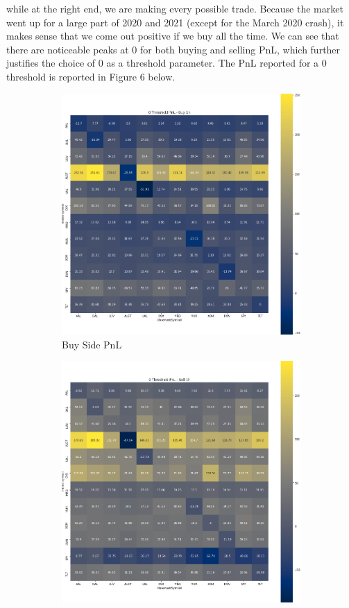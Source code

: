 \documentclass{article}
\begin{document}
while at the right end, we are making every possible trade. Because the market went
up for a large part of 2020 and 2021 (except for the March 2020 crash), it makes sense
that we come out positive if we buy all the time. 
We can see that there are noticeable peaks at 0 for both buying and selling PnL, which
further justifies the choice of 0 as a threshold parameter. The PnL reported for a
0 threshold is reported in Figure 6 below.
\begin{figure}[h!]
  \centering
  \begin{subfigure}{.5\textwidth}
    \centering
    \includegraphics[width=.95\linewidth]{../Figures/pair_buy_pnl_1h.png}
    \caption{Buy Side PnL}
  \end{subfigure}%
  \begin{subfigure}{.5\textwidth}
    \centering
    \includegraphics[width=.95\linewidth]{../Figures/pair_sell_pnl_1h.png}

\end{subfigure}
\end{figure}
\end{document}
